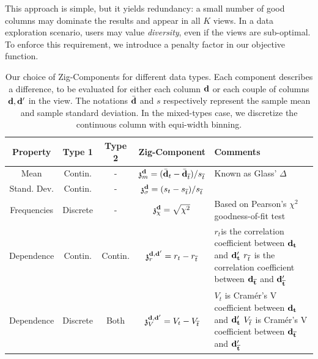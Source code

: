 This approach is simple, but it yields redundancy: a small number of good
columns may dominate the results and appear in all $K$ views. In a data
exploration scenario, users may value \emph{diversity}, even if the views are
sub-optimal. To enforce this requirement, we introduce a penalty factor in our
objective function.
\begin{table}[t!]
    \centering
    \begin{tabular}{ccccp{9cm}}
      \hline
    \rowcolor{gray!50}
      Property & Type 1 & Type 2 & Zig-Component & Comments\\
      \hline
      Mean & Contin.  & - &
      $  \mathfrak{z}_m^{\bf{d}}  = (\bar{\bf{d}}_t - \bar{\bf{d}}_{\overline{t}}) / s_{\overline{t}}$ & 
      Known as Glass' $\Delta$~\cite{hedges2014statistical}\\
      Stand. Dev.& Contin.  & - &
      $ \mathfrak{z}_{\sigma}^{\bf{d}}=(s_t-s_{\overline{t}})/s_{\overline{t}}$ & \\
      Frequencies & Discrete & - & 
      $\mathfrak{z}_\chi ^{\bf{d}}= \sqrt{\chi^2}$ &
      Based on Pearson's $\chi^2$ goodness-of-fit test~\cite{wasserman2013all}\\
      Dependence & Contin. & Contin. & $\mathfrak{z}_r^{\bf{d}, \bf{d}'}  = r_t - r_{\overline{t}} $ & 
      $r_t$is the correlation coefficient between $\bf{d}_t$ and  $\bf{d}'_t$\newline
      $r_{\overline{t}}$ is the correlation coefficient between $\bf{d}_{\overline{t}}$ and
      $\bf{d}'_{\overline{t}}$~\cite{wasserman2013all}\\
     Dependence  & Discrete & Both & $ \mathfrak{z}_V^{\bf{d}, \bf{d}'} = V_t - V_{\overline{t}} $ &
           $V_t$ is Cram\'er's V coefficient between $\bf{d}_t$ and  $\bf{d}'_t$ \newline
           $V_{\overline{t}}$ is Cram\'er's V coefficient between $\bf{d}_{\overline{t}}$ and
           $\bf{d}'_{\overline{t}}$~\cite{cohen1977statistical} \\ 
      \hline
    \end{tabular}
    \caption{Our choice of Zig-Components for different data types. Each
        component describes a difference, to be evaluated for either each
        column $\bf{d}$ or each couple of columns $\bf{d}, \bf{d}'$ in the
        view. The notations $\bar{\bf{d}}$ and $s$ respectively represent the
        sample mean and sample standard deviation. In the mixed-types case, we
        discretize the continuous column with equi-width binning.}
    \label{tab:dissim}
\end{table}

